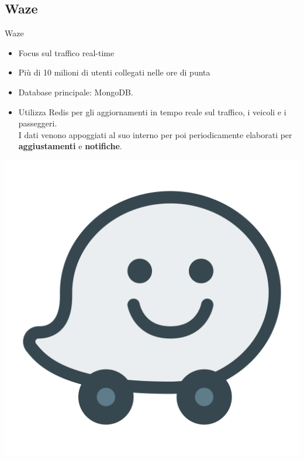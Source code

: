 \documentclass[xcolor=dvipsnames]{beamer}
\begin{document}
        \subsection{Waze}
          \begin{frame}{Waze}
            \begin{itemize}
              \item Focus sul traffico real-time
              \item Più di 10 milioni di utenti collegati nelle ore di punta
              \item Database principale: MongoDB.
              \item Utilizza Redis per gli aggiornamenti in tempo reale sul traffico, i veicoli e i passeggeri. \\
                    I dati venono appoggiati al suo interno per poi periodicamente elaborati per \textbf{aggiustamenti} e \textbf{notifiche}.
            \end{itemize}



            \begin{center}
            \includegraphics[height=2.cm]{res/waze.png}
            \end{center}
          \end{frame}
\end{document}
